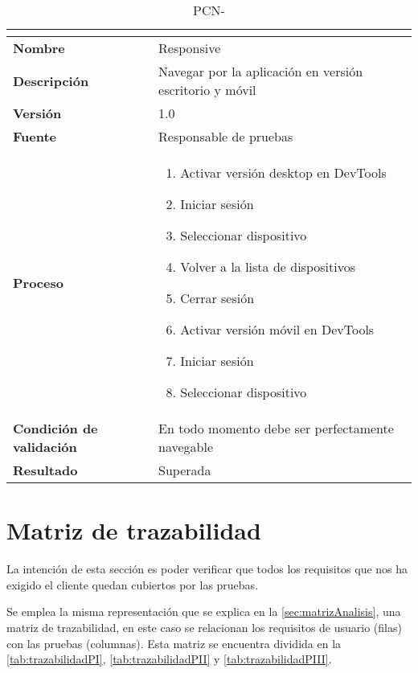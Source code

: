 \begin{table}[H]
	\caption{PCN-\number\pcn}
	\begin{tabular}{|l|p{}|}
		\hline
		\multicolumn{2}{|c|}{\cellcolor[HTML]{BFBFBF}{\color[HTML]{000000} \textbf{PCN-\number\pcn}}} \\ \hline
		\textbf{Nombre}                  & Responsive                                              \\ \hline
		\textbf{Descripción}             & Navegar por la aplicación en versión escritorio y móvil \\ \hline
		\textbf{Versión}                 & 1.0                                                     \\ \hline
		\textbf{Fuente}                  & Responsable de pruebas                                  \\ \hline
		\textbf{Proceso}                 & \begin{enumerate}
			\item Activar versión desktop en DevTools
			\item Iniciar sesión
			\item Seleccionar dispositivo
			\item Volver a la lista de dispositivos
			\item Cerrar sesión
			\item Activar versión móvil en DevTools
			\item Iniciar sesión
			\item Seleccionar dispositivo
		\end{enumerate}                              \\ \hline
		\textbf{Condición de validación} & En todo momento debe ser perfectamente navegable        \\ \hline
		\textbf{Resultado}               & Superada                                                \\ \hline
	\end{tabular}
\end{table}
\pagebreak

\section{Matriz de trazabilidad}\label{sec:matriz-de-trazabilidad}
La intención de esta sección es poder verificar que todos los requisitos que nos ha exigido el cliente quedan cubiertos por las pruebas. 

Se emplea la misma representación que se explica en la \autoref{sec:matrizAnalisis}, una matriz de trazabilidad, en este caso se relacionan los requisitos de usuario (filas) con las pruebas (columnas). Esta matriz se encuentra dividida en la \autoref{tab:trazabilidadPI}, \autoref{tab:trazabilidadPII} y \autoref{tab:trazabilidadPIII}.

